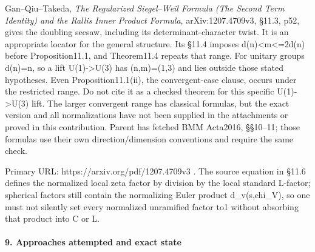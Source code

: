 Gan--Qiu--Takeda, \emph{The Regularized Siegel--Weil Formula (The Second Term Identity) and the Rallis Inner Product Formula}, arXiv:1207.4709v3, §11.3, p52, gives the doubling seesaw, including its determinant-character twist. It is an appropriate locator for the general structure. Its §11.4 imposes d(n)\textless m\textless=2d(n) before Proposition11.1, and Theorem11.4 repeats that range. For unitary groups d(n)=n, so a lift U(1)-\textgreater U(3) has (n,m)=(1,3) and lies outside those stated hypotheses. Even Proposition11.1(ii), the convergent-case clause, occurs under the restricted range. Do not cite it as a checked theorem for this specific U(1)-\textgreater U(3) lift. The larger convergent range has classical formulas, but the exact version and all normalizations have not been supplied in the attachments or proved in this contribution. Parent has fetched BMM Acta2016, §§10--11; those formulas use their own direction/dimension conventions and require the same check.

Primary URL: https://arxiv.org/pdf/1207.4709v3 . The source equation in §11.6 defines the normalized local zeta factor by division by the local standard L-factor; spherical factors still contain the normalizing Euler product d\_v(s,chi\_V), so one must not silently set every normalized unramified factor to1 without absorbing that product into C or L.

\paragraph{9. Approaches attempted and exact state}\label{approaches-attempted-and-exact-state}


